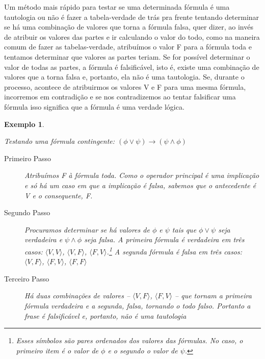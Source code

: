 \documentclass[a4paper,10pt]{article}
\newtheorem{exmpl}{Exemplo}[subsection] %
\begin{document}
\vspace{3em}
Um método mais rápido para testar se uma determinada fórmula é uma tautologia ou não é
fazer a tabela-verdade de trás pra frente tentando determinar se há uma combinação de
valores que torna a fórmula falsa, quer dizer, ao invés de atribuir os valores das
partes e ir calculando o valor do todo, como na maneira comum de fazer as
tabelas-verdade, atribuímos o valor F para a fórmula toda e tentamos determinar que
valores as partes teriam. Se for possível determinar o valor de todas as partes, a
fórmula é falsificável, isto é, existe uma combinação de valores que a torna falsa e,
portanto, ela não é uma tautologia. Se, durante o processo, acontece de atribuirmos os
valores V e F para uma mesma fórmula, incorremos em contradição e se nos contradizemos
ao tentar falsificar uma fórmula isso significa que a fórmula é uma verdade lógica.

\begin{exmpl}
\label{testcont}

Testando uma fórmula contingente: $(\phi\vee\psi)\rightarrow(\psi\wedge\phi)$

\begin{description}
 \item[Primeiro Passo] Atribuímos F à fórmula toda. Como o operador principal é uma
implicação e só há um caso em que a implicação é falsa, sabemos que o antecedente é V e
o consequente, F.
\item[Segundo Passo] Procuramos determinar se há valores de $\phi$ e $\psi$ tais que
$\phi\vee\psi$ seja verdadeira e $\psi\wedge\phi$ seja falsa. A primeira fórmula é
verdadeira em três casos: $\langle{}V,V{}\rangle$, $\langle{}V,F{}\rangle$,
$\langle{}F,V{}\rangle$.\footnote{Esses símbolos são pares ordenados dos valores das
fórmulas. No caso, o primeiro item é o valor de $\phi$ e o segundo o valor de $\psi$.} A
segunda fórmula é falsa em três casos: $\langle{}V,F{}\rangle$, $\langle{}F,V{}\rangle$,
$\langle{}F,F{}\rangle$
\item[Terceiro Passo] Há duas combinações de valores -- $\langle{}V,F{}\rangle$,
$\langle{}F,V{}\rangle$ -- que tornam a primeira fórmula verdadeira e a segunda, falsa,
tornando o todo falso. Portanto a frase é falsificável e, portanto, \emph{não} é uma
tautologia
\end{description}

\end{exmpl}
\end{document}
